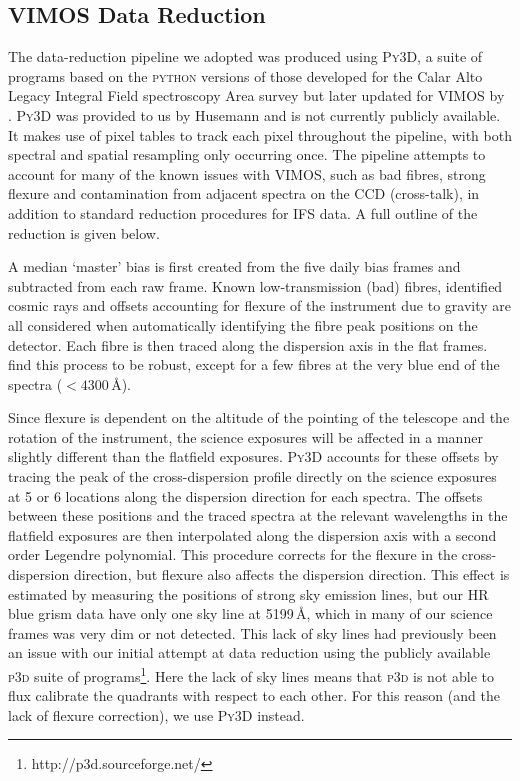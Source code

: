 	\subsection{VIMOS Data Reduction}
		\label{subsec:VIMOSreduction}
		The data-reduction pipeline we adopted was produced using \textsc{Py3D}, a suite of programs based on the \textsc{python} versions of those developed for the Calar Alto Legacy Integral Field spectroscopy Area survey \citep[CALIFA;][]{Sanchez2012, Husemann2013} but later updated for VIMOS by \citet{Husemann2014}. \textsc{Py3D} was provided to us by Husemann and is not currently publicly available. It  makes use of pixel tables to track each pixel throughout the pipeline, with both spectral and spatial resampling only occurring once. The pipeline attempts to account for many of the known issues with VIMOS, such as bad fibres, strong flexure and contamination from adjacent spectra on the CCD (cross-talk), in addition to standard reduction procedures for IFS data. A full outline of the reduction is given below.

		A median `master' bias is first created from the five daily bias frames and subtracted from each raw frame. Known low-transmission (bad) fibres, identified cosmic rays and offsets accounting for flexure of the instrument due to gravity are all considered when automatically identifying the fibre peak positions on the detector. Each fibre is then traced along the dispersion axis in the flat frames. \citet{Husemann2014} find this process to be robust, except for a few fibres at the very blue end of the spectra ($<4300$\,\AA). 

		Since flexure is dependent on the altitude of the pointing of the telescope and the rotation of the instrument, the science exposures will be affected in a manner slightly different than the flatfield exposures. \textsc{Py3D} accounts for these offsets by tracing the peak of the cross-dispersion profile directly on the science exposures at 5 or 6 locations along the dispersion direction for each spectra. The offsets between these positions and the traced spectra at the relevant wavelengths in the flatfield exposures are then interpolated along the dispersion axis with a second order Legendre polynomial. This procedure corrects for the flexure in the cross-dispersion direction, but flexure also affects the dispersion direction. This effect is estimated by measuring the positions of strong sky emission lines, but our HR blue grism data have only one sky line at 5199\,\AA, which in many of our science frames was very dim or not detected. This lack of sky lines had previously been an issue with our initial attempt at data reduction using the publicly available \textsc{p3d} suite of programs\footnote{http://p3d.sourceforge.net/}. Here the lack of sky lines means that \textsc{p3d} is not able to flux calibrate the quadrants with respect to each other. For this reason (and the lack of flexure correction), we use \textsc{Py3D} instead.

